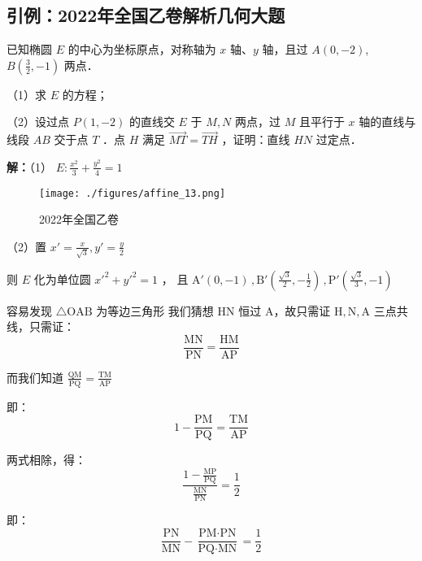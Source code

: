 \begin{issues}
\end{issues}

\subsection{引例：2022年全国乙卷解析几何大题}

已知椭圆 $\displaystyle{E}$ 的中心为坐标原点，对称轴为 $\displaystyle{x}$ 轴、$\displaystyle{y}$ 轴，且过 $\displaystyle{A(0,-2)}$,$\displaystyle{B(\frac{3}{2},-1)}$ 两点．

（1）求 $\displaystyle{E}$ 的方程；

（2）设过点 $\displaystyle{P(1,-2)}$ 的直线交 $\displaystyle{E}$ 于 $\displaystyle{M,N}$ 两点，过 $\displaystyle{M}$ 且平行于 $\displaystyle{x}$ 轴的直线与线段 $\displaystyle{AB}$ 交于点 $\displaystyle{T}$ ．点 $\displaystyle{H}$ 满足 $\displaystyle{\overrightarrow{MT}=\overrightarrow{TH}}$ ，证明：直线 $\displaystyle{HN}$ 过定点．

\textbf{解：}（1） $\displaystyle{E:\frac{x^2}{3}+\frac{y^2}{4}=1}$
\begin{figure}[ht]
\centering
\texttt{[image: ./figures/affine\_13.png]}
\caption{2022年全国乙卷} \label{affine_fig13}
\end{figure}
（2）置 $\displaystyle{x'=\frac{x}{\sqrt{3}},y'=\frac{y}{2}}$

则 $\displaystyle{E}$ 化为单位圆 $\displaystyle{x'^2+y'^2=1}$ ， 且 $\displaystyle{\text{A}'(0,-1)\,,\text{B}'\left(\frac{\sqrt{3}}{2},-\frac{1}{2}\right)\,,\text{P}'\left(\frac{\sqrt{3}}{3},-1\right)}$

容易发现 $\displaystyle{\triangle \text{OAB}}$ 为等边三角形
我们猜想 $\displaystyle{\text{HN}}$ 恒过 $\displaystyle{\text{A}}$，故只需证 $\displaystyle{\text{H},\text{N},\text{A}}$ 三点共线，只需证：
$$\frac{\text{MN}}{\text{PN}}=\frac{\text{HM}}{\text{AP}}$$

而我们知道 $\displaystyle{\frac{\text{QM}}{\text{PQ}}=\frac{\text{TM}}{\text{AP}}}$ 

即：
$$1-\frac{\text{PM}}{\text{PQ}}=\frac{\text{TM}}{\text{AP}}$$

两式相除，得：
$$\frac{1-\frac{\text{MP}}{\text{PQ}}}{\frac{\text{MN}}{\text{PN}}}=\frac{1}{2}$$

即：
$$\frac{\text{PN}}{\text{MN}}-\frac{\text{PM}\cdot\text{PN}}{\text{PQ}\cdot\text{MN}}=\frac{1}{2}$$


